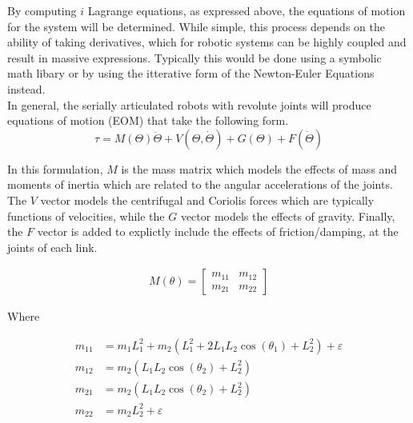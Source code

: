 \documentclass[journal]{IEEEtran}
\begin{document}
By computing $i$ Lagrange equations, as expressed above, the equations of motion for the system will be determined. While simple, this process depends on the ability of taking derivatives, which for robotic systems can be highly coupled and result in massive expressions. Typically this would be done using a symbolic math libary or by using the itterative form of the Newton-Euler Equations instead.\\

In general, the serially articulated robots with revolute joints will produce equations of motion (EOM) that take the following form.
\begin{equation}\label{eq:robot_dyn}
  \tau = M(\Theta)\ddot{\Theta} + V(\Theta, \dot{\Theta}) + G(\Theta) + F(\dot{\Theta})
\end{equation}


In this formulation, $M$ is the mass matrix which models the effects of mass and moments of inertia which are related to the angular accelerations of the joints. The $V$ vector models the centrifugal and Coriolis forces which are typically functions of velocities, while the $G$ vector models the effects of gravity. Finally, the $F$ vector is added to explictly include the effects of friction/damping, at the joints of each link.

\begin{equation}
\begin{aligned}
M(\theta)=\left[\begin{array}{ll}
 m_{11} & m_{12}  \\
 m_{21} & m_{22} \end{array}\right]
\end{aligned}
\end{equation}

Where

\begin{equation*}
\begin{aligned}
  m_{11} & = m_{1} L_{1}^{2}+m_{2}\left(L_{1}^{2}+2 L_{1} L_{2} \cos \left(\theta_{1}\right)+L_{2}^{2}\right) + \varepsilon \\
  m_{12} & = m_{2}\left(L_{1} L_{2} \cos \left(\theta_{2}\right)+L_{2}^{2}\right) \\
  m_{21} & = m_{2}\left(L_{1} L_{2} \cos \left(\theta_{2}\right)+L_{2}^{2}\right)\\
  m_{22} & = m_{2} L_{2}^{2}+\varepsilon
\end{aligned}
\end{equation*}
\end{document}
